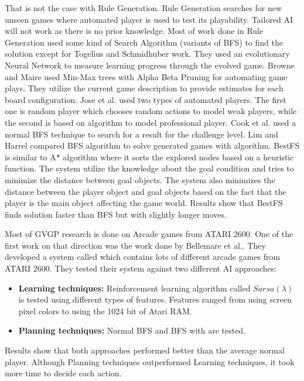 That is not the case with Rule Generation. Rule Generation searches for new unseen games where automated player is used to test its playability. Tailored AI will not work as there is no prior knowledge. Most of work done in Rule Generation used some kind of Search Algorithm (variants of BFS) to find the solution except for Togelius and Schmidhuber\cite{arcadeHillClimber} work. They used an evolutionary Neural Network to measure learning progress through the evolved game. Browne and Maire\cite{evolveBrowne} used Min-Max trees with Alpha Beta Pruning for automating game plays. They utilize the current game description to provide estimates for each board configuration. Jose et al.\cite{generationCardGames} used two types of automated players. The first one is random player which chooses random actions to model weak players, while the second is based on  algorithm to model professional player. Cook et al.\cite{mechanicMiner} used a normal BFS technique to search for a result for the challenge level. Lim and Harrel\cite{puzzleScriptGeneration} compared BFS algorithm to solve generated games with  algorithm. BestFS is similar to A* algorithm where it sorts the explored nodes based on a heuristic function. The system utilize the knowledge about the goal condition and tries to minimize the distance between goal objects. The system also minimizes the distance between the player object and goal objects based on the fact that the player is the main object affecting the game world. Results show that BestFS finds solution faster than BFS but with slightly longer moves.\\\par

Most of GVGP research is done on Arcade games from ATARI 2600. One of the first work on that direction was the work done by Bellemare et al.\cite{arcadeLearningEnviroment}. They developed a system called  which contains lots of different arcade games from ATARI 2600. They tested their system against two different AI approaches:
\begin{itemize} \itemsep0pt \parskip0pt 
	\item \textbf{Learning techniques:} Reinforcement learning algorithm called $Sarsa(\lambda)$ is tested using different types of features. Features ranged from using screen pixel colors to using the 1024 bit of Atari RAM.
	\item \textbf{Planning techniques:} Normal BFS and BFS with  are tested.
\end{itemize}
Results show that both approaches performed better than the average normal player. Although Planning techniques outperformed Learning techniques, it took more time to decide each action.\\\par

